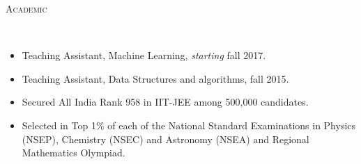 \documentclass[9pt]{article}
\newenvironment{changemargin}[2]{%
  \begin{list}{}{%
    \setlength{\topsep}{0pt}%
    \setlength{\leftmargin}{#1}%
    \setlength{\rightmargin}{#2}%
    \setlength{\listparindent}{\parindent}%
    \setlength{\itemindent}{\parindent}%
    \setlength{\parsep}{\parskip}%
  }%
  \item[]}{\end{list}
}
\newcommand{\lineover}{
	\begin{changemargin}{-0.05in}{-0.10in}
		\vspace*{-9pt}
		\hrulefill \\
		\vspace*{-2pt}
	\end{changemargin}
}
\newcommand{\header}[1]{
	\begin{changemargin}{-0.5in}{-0.5in}
		\scshape{#1}\\
  	\lineover
	\end{changemargin}
}
\newenvironment{body} {
	\vspace*{-16pt}
	\begin{changemargin}{-0.6in}{-0.65in}
  }	
	{\end{changemargin}
}
\begin{document}

	  

\header{Academic}
\begin{body}
	\vspace{14pt}
	\begin{changemargin}{0.15in}{0.15in}
	\begin{itemize}
	  \item Teaching Assistant, Machine Learning, \emph{starting} fall 2017.
	  \item Teaching Assistant, Data Structures and algorithms, fall 2015.
	  \item Secured All India Rank 958 in IIT-JEE among 500,000 candidates.
	  \item Selected in Top 1\% of each of the National Standard Examinations in Physics (NSEP), Chemistry (NSEC) and Astronomy (NSEA) and Regional Mathematics Olympiad.
	\end{itemize}
	\end{changemargin}
\end{body}
\end{document}
